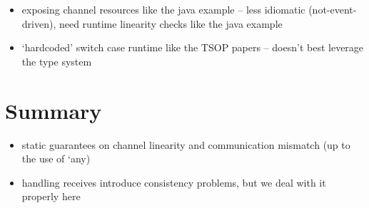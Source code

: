 \begin{itemize}
\item exposing channel resources like the java example -- less idiomatic (not-event-driven), need runtime linearity checks like the java example
\item `hardcoded' switch case runtime like the TSOP papers -- doesn't best leverage the type system
\end{itemize}

\section{Summary}
\begin{itemize}
\item static guarantees on channel linearity and communication mismatch (up to the use of `any)
\item handling receives introduce consistency problems, but we deal with it properly here
\end{itemize}
